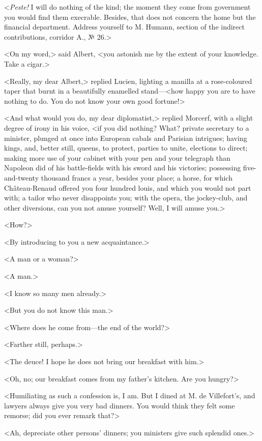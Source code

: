  <\textit{Peste!} I will do nothing of the kind; the moment they come from government you would find them execrable. Besides, that does not concern the home but the financial department. Address yourself to M. Humann, section of the indirect contributions, corridor A., № 26.> 

 <On my word,> said Albert, <you astonish me by the extent of your knowledge. Take a cigar.> 

 <Really, my dear Albert,> replied Lucien, lighting a manilla at a rose-coloured taper that burnt in a beautifully enamelled stand—<how happy you are to have nothing to do. You do not know your own good fortune!> 

 <And what would you do, my dear diplomatist,> replied Morcerf, with a slight degree of irony in his voice, <if you did nothing? What? private secretary to a minister, plunged at once into European cabals and Parisian intrigues; having kings, and, better still, queens, to protect, parties to unite, elections to direct; making more use of your cabinet with your pen and your telegraph than Napoleon did of his battle-fields with his sword and his victories; possessing five-and-twenty thousand francs a year, besides your place; a horse, for which Château-Renaud offered you four hundred louis, and which you would not part with; a tailor who never disappoints you; with the opera, the jockey-club, and other diversions, can you not amuse yourself? Well, I will amuse you.> 

 <How?> 

 <By introducing to you a new acquaintance.> 

 <A man or a woman?> 

 <A man.> 

 <I know so many men already.> 

 <But you do not know this man.> 

 <Where does he come from—the end of the world?> 

 <Farther still, perhaps.> 

 <The deuce! I hope he does not bring our breakfast with him.> 

 <Oh, no; our breakfast comes from my father's kitchen. Are you hungry?> 

 <Humiliating as such a confession is, I am. But I dined at M. de Villefort's, and lawyers always give you very bad dinners. You would think they felt some remorse; did you ever remark that?> 

 <Ah, depreciate other persons' dinners; you ministers give such splendid ones.> 

